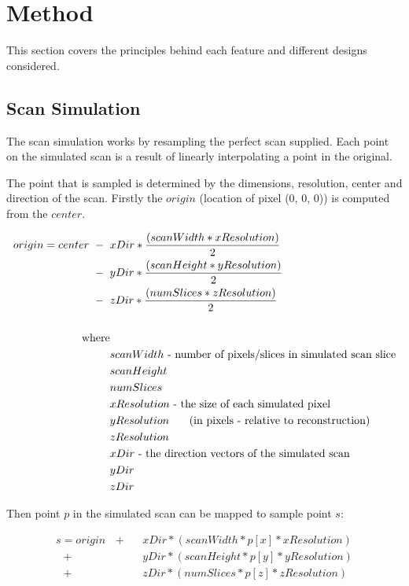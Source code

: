 \chapter{Method}

This section covers the principles behind each feature and different designs considered.

\section{Scan Simulation}
The scan simulation works by resampling the perfect scan supplied. Each point on the simulated scan is a result of linearly interpolating a point in the original.

The point that is sampled is determined by the dimensions, resolution, center and direction of the scan. Firstly the $origin$ (location of pixel (0, 0, 0)) is computed from the $center$.

\begin{align*}
origin = center \text{ }-\text{ }& xDir * \frac{(scanWidth * xResolution)}{2} \nonumber \\
 	  			\text{ }-\text{ }& yDir * \frac{(scanHeight * yResolution)}{2} \nonumber \\
 	  			\text{ }-\text{ }& zDir * \frac{(numSlices * zResolution)}{2} \nonumber \\
 	  			\\
	\text{where}& \\
	& scanWidth \text{ - number of pixels/slices in simulated scan slice} \nonumber \\
	& scanHeight \nonumber \\
	& numSlices \nonumber \\
	& xResolution \text{ - the size of each simulated pixel} \nonumber \\
	& yResolution \text{\hspace*{1.5em} (in pixels - relative to reconstruction)} \nonumber \\
	& zResolution \nonumber \\
	& xDir \text{ - the direction vectors of the simulated scan} \nonumber \\
	& yDir \nonumber \\
	& zDir \nonumber
\end{align*}

Then point $p$ in the simulated scan can be mapped to sample point $s$:

\begin{align*}
	 s = origin \text{ }+\text{ }& xDir * (scanWidth * p[x] * xResolution) \nonumber \\
 	  			\text{ }+\text{ }& yDir * (scanHeight * p[y] * yResolution) \nonumber \\
 	  			\text{ }+\text{ }& zDir * (numSlices * p[z] * zResolution) \nonumber \\ 	  			
\end{align*}

